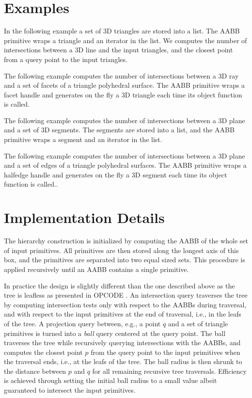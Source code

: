 \section{Examples}
\label{AABB_tree_section_examples}

In the following example a set of 3D triangles are stored into a list. The AABB primitive wraps a triangle and an iterator in the list. We computes the number of intersections between a 3D line and the input triangles, and the closest point from a query point to the input triangles.

The following example computes the number of intersections between a 3D ray and a set of facets of a triangle polyhedral surface. The AABB primitive wraps a facet handle and generates on the fly a 3D triangle each time its object function is called.

The following example computes the number of intersections between a 3D plane and a set of 3D segments. The segments are stored into a list, and the AABB primitive wraps a segment and an iterator in the list.

The following example computes the number of intersections between a 3D plane and a set of edges of a triangle polyhedral surfaces. The AABB primitive wraps a halfedge handle and generates on the fly a 3D segment each time its object function is called..

\section{Implementation Details}
\label{AABB_tree_section_intro}

The hierarchy construction is initialized by computing the AABB of the whole set of input primitives. All primitives are then stored along the longest axis of this box, and the primitives are separated into two equal sized sets. This procedure is applied recursively until an AABB contains a single primitive. 

In practice the design is slightly different than the one described above as the tree is leafless as presented in OPCODE \cite{opcode}. An intersection query traverses the tree by computing intersection tests only with respect to the AABBs during traversal, and with respect to the input primitives at the end of traversal, i.e., in the leafs of the tree. A projection query between, e.g., a point $q$ and a set of triangle primitives is turned into a \emph{ball} query centered at the query point. The ball traverses the tree while recursively querying intersections with the AABBs, and computes the closest point $p$ from the query point to the input primitives when the traversal ends, i.e., at the leafs of the tree. The ball radius is then shrunk to the distance between $p$ and $q$ for all remaining recursive tree traversals. Efficiency is achieved through setting the initial ball radius to a small value albeit guaranteed to intersect the input primitives.